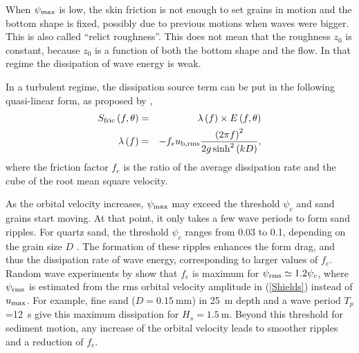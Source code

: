 When  $\psi _{{\rm max}}$ is low, the skin friction is not enough to set grains in motion and the bottom shape is fixed, possibly due to 
previous motions when waves were bigger. This is also called ``relict roughness''. This does not mean that the roughness $z_0$ is constant, 
because $z_0$ is a function of both the bottom shape and the flow. 
In that regime the dissipation of wave energy is weak. 

In a turbulent regime, the dissipation source term can be put in the following quasi-linear form, as proposed by \cite{Madsen&al.1990}, 
\begin{eqnarray}
\label{SandLforfriction}
S_{\mathrm{fric}}\left(f,\theta\right) &=&\lambda \left(f\right)
\times E\left(f,\theta\right)
\label{model S} \\
\lambda \left(f\right) &=&-f_{e}u_{\rm b,rms}\frac{\left( 2\pi
f\right) ^{2}}{2g\sinh ^{2}\left( kD\right) },  \label{model lambda}
\end{eqnarray}
where the friction factor  $f_{e}$ is the ratio of the average dissipation rate and the cube of the root mean square velocity. 

As the orbital velocity increases, $\psi _{{\rm max}}$ may exceed the threshold $\psi _c$ and sand grains start moving. 
At that point, it only takes a few wave periods to form sand ripples. For quartz sand, the threshold $\psi _{c}$ ranges from 0.03 to 0.1, depending 
on the grain size $D$ \citep[e.g.][]{Soulsby1997}. The formation of these ripples enhances the form drag, and thus the dissipation 
rate of wave energy, corresponding to larger values of $f_{e}$. Random wave experiments by \cite{Madsen&al.1990} show that 
$f_{e}$ is maximum for  $\psi_{\rm rms} \simeq 1.2\psi _{c}$, where  $\psi_{\rm
rms}$ is estimated from the rms orbital velocity amplitude in  (\ref{Shields}) instead of $u_{{\rm max}}$.
For example, fine sand  ($D=0.15~$mm) in  25~m depth and a wave period $T_{p}$=12~s give this maximum dissipation for 
$H_{s}=1.5~$m. Beyond this threshold for sediment motion, any increase of the orbital velocity 
leads to smoother ripples and a reduction of $f_{e}$.

